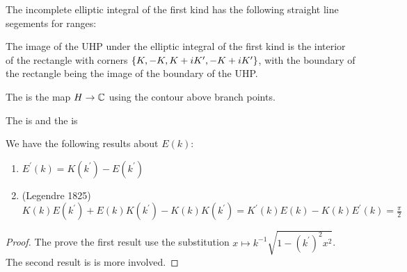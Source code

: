 \documentclass{article}
\begin{document}
\begin{prop}
	The incomplete elliptic integral of the first kind has the following straight line segements for ranges:
\end{prop}

\begin{corollary}
	The image of the UHP under the elliptic integral of the first kind is the interior of the rectangle with corners $\left\{ K,-K,K+iK^\prime, -K+iK^\prime \right\}$, with the boundary of the rectangle being the image of the boundary of the UHP.
\end{corollary}

\begin{definition}
	The  is the map $H\to \mathbb{C}$ 
	using the contour above branch points.
\end{definition}

\begin{definition}
	The  is 
	and the  is 
\end{definition}

\begin{prop}
	We have the following results about $E(k)$:
	\begin{enumerate}
		\item $E^\prime(k) = K(k^\prime) - E(k^\prime)$
		\item (Legendre 1825) $K(k)E(k^\prime) + E(k)K(k^\prime) - K(k)K(k^\prime) = K^\prime(k)E(k) - K(k) E^\prime(k) = \frac{\pi}{2}$
	\end{enumerate}
\end{prop}
\begin{proof}
	The prove the first result use the substitution $x \mapsto k^{-1}\sqrt{1-(k^\prime)^2 x^2}$. \\
	The second result is is more involved. 
\end{proof}
\end{document}
